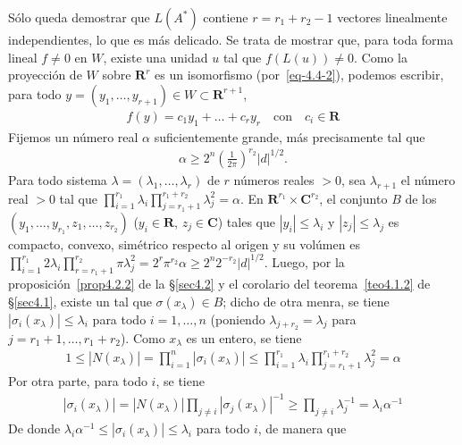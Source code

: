 \documentclass[bibtotoc,leqno,spanish]{amsbook}
\let\emph\relax %
\newcommand{\RR}{\mathbf{R}}
\newcommand{\CC}{\mathbf{C}}
\newcommand{\abs}[1]{\left\lvert#1\right\rvert}
\numberwithin{equation}{section}
\theoremstyle{note}
\theoremstyle{note}
\theoremstyle{rem}
\numberwithin{theorem}{section}
\numberwithin{proposition}{section}
\numberwithin{definition}{section}
\numberwithin{lemma}{section}
\numberwithin{corollary}{section}
\numberwithin{example}{section}
\numberwithin{footnote}{section}%
\begin{document}
S\'olo queda demostrar que $L(A^{*})$ contiene $r = r_{1}+r_{2}-1$ vectores linealmente independientes,
lo que es m\'as delicado. Se trata de mostrar que, para toda forma lineal $f\neq 0$ en $W$, existe una unidad
$u$ tal que $f(L(u))\neq 0$. Como la proyecci\'on de $W$ sobre $\RR^{r}$ es un isomorfismo
(por~\eqref{eq-4.4-2}), podemos escribir, para todo $y=(y_{1},\dots,y_{r+1})\in W\subset\RR^{r+1}$,
\begin{gather}\label{eq-4.4-3}
f(y) = c_{1}y_{1}+\dots+c_{r}y_{r}\quad\text{con}\quad c_{i}\in\RR
\end{gather}
Fijemos un n\'umero real $\alpha$ suficientemente grande, m\'as precisamente tal que
\begin{gather*}
\alpha\geq 2^{n}\left(\frac{1}{2\pi}\right)^{r_{2}}\abs{d}^{1/2}.
\end{gather*}
Para todo sistema $\lambda = (\lambda_{1},\dots,\lambda_{r})$ de $r$ n\'umeros reales $>0$, sea
$\lambda_{r+1}$ el n\'umero real $>0$ tal que $\prod_{i=1}^{r_{1}}\lambda_{i}\prod_{j=r_{1}+1}^{r_{1}+r_{2}}\lambda_{j}^{2}=\alpha$.
En $\RR^{r_{1}}\times\CC^{r_{2}}$, el conjunto $B$ de los $(y_{1},\dots,y_{r_{1}},z_{1},\dots,z_{r_{2}})$
($y_{i}\in\RR$, $z_{j}\in\CC$) tales que $\abs{y_{i}}\leq\lambda_{i}$ y $\abs{z_{j}}\leq\lambda_{j}$
es compacto, convexo, sim\'etrico respecto al origen y su vol\'umen es $\prod_{i=1}^{r_{1}}2\lambda_{i}
\prod_{r=r_{1}+1}^{r_{2}}\pi\lambda_{j}^{2}=2^{r}\pi^{r_{2}}\alpha\geq 2^{n}2^{-r_{2}}\abs{d}^{1/2}$.
Luego, por la proposici\'on~\ref{prop4.2.2} de la \S\ref{sec4.2} y
el corolario del teorema~\ref{teo4.1.2} de \S\ref{sec4.1}, existe un \emph{entero $x_{\lambda}$
de $K$} tal que $\sigma(x_{\lambda})\in B$; dicho de otra menra, se tiene $\abs{\sigma_{i}(x_{\lambda})}
\leq\lambda_{i}$ para todo $i=1,\dots,n$ (poniendo $\lambda_{j+r_{2}}=\lambda_{j}$ para $j=r_{1}+1,\dots,r_{1}+r_{2}$).
Como $x_{\lambda}$ es un entero, se tiene
\begin{gather*}
1\leq\abs{N(x_{\lambda})}=\prod_{i=1}^{n}\abs{\sigma_{i}(x_{\lambda})}\leq\prod_{i=1}^{r_{1}}\lambda_{i}
\prod_{j=r_{1}+1}^{r_{1}+r_{2}}\lambda_{j}^{2}=\alpha
\end{gather*}
Por otra parte, para todo $i$, se tiene
\begin{gather*}
\abs{\sigma_{i}(x_{\lambda})}=\abs{N(x_{\lambda})}\prod_{j\neq i}\abs{\sigma_{j}(x_{\lambda})}^{-1}
\geq\prod_{j\neq i}\lambda_{j}^{-1}=\lambda_{i}\alpha^{-1}
\end{gather*}
De donde $\lambda_{i}\alpha^{-1}\leq\abs{\sigma_{i}(x_{\lambda})}\leq\lambda_{i}$ para todo $i$, de manera que
\end{document}
